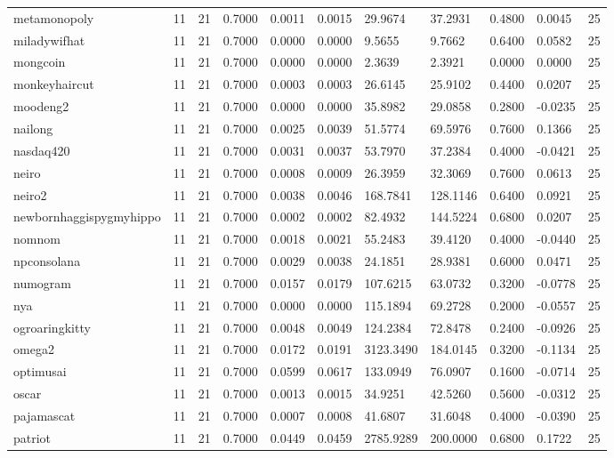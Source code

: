 \begin{table}[htbp]
\begin{tabular}{lllllllllll}
metamonopoly & 11 & 21 & 0.7000 & 0.0011 & 0.0015 & 29.9674 & 37.2931 & 0.4800 & 0.0045 & 25 \\
miladywifhat & 11 & 21 & 0.7000 & 0.0000 & 0.0000 & 9.5655 & 9.7662 & 0.6400 & 0.0582 & 25 \\
mongcoin & 11 & 21 & 0.7000 & 0.0000 & 0.0000 & 2.3639 & 2.3921 & 0.0000 & 0.0000 & 25 \\
monkeyhaircut & 11 & 21 & 0.7000 & 0.0003 & 0.0003 & 26.6145 & 25.9102 & 0.4400 & 0.0207 & 25 \\
moodeng2 & 11 & 21 & 0.7000 & 0.0000 & 0.0000 & 35.8982 & 29.0858 & 0.2800 & -0.0235 & 25 \\
nailong & 11 & 21 & 0.7000 & 0.0025 & 0.0039 & 51.5774 & 69.5976 & 0.7600 & 0.1366 & 25 \\
nasdaq420 & 11 & 21 & 0.7000 & 0.0031 & 0.0037 & 53.7970 & 37.2384 & 0.4000 & -0.0421 & 25 \\
neiro & 11 & 21 & 0.7000 & 0.0008 & 0.0009 & 26.3959 & 32.3069 & 0.7600 & 0.0613 & 25 \\
neiro2 & 11 & 21 & 0.7000 & 0.0038 & 0.0046 & 168.7841 & 128.1146 & 0.6400 & 0.0921 & 25 \\
newbornhaggispygmyhippo & 11 & 21 & 0.7000 & 0.0002 & 0.0002 & 82.4932 & 144.5224 & 0.6800 & 0.0207 & 25 \\
nomnom & 11 & 21 & 0.7000 & 0.0018 & 0.0021 & 55.2483 & 39.4120 & 0.4000 & -0.0440 & 25 \\
npconsolana & 11 & 21 & 0.7000 & 0.0029 & 0.0038 & 24.1851 & 28.9381 & 0.6000 & 0.0471 & 25 \\
numogram & 11 & 21 & 0.7000 & 0.0157 & 0.0179 & 107.6215 & 63.0732 & 0.3200 & -0.0778 & 25 \\
nya & 11 & 21 & 0.7000 & 0.0000 & 0.0000 & 115.1894 & 69.2728 & 0.2000 & -0.0557 & 25 \\
ogroaringkitty & 11 & 21 & 0.7000 & 0.0048 & 0.0049 & 124.2384 & 72.8478 & 0.2400 & -0.0926 & 25 \\
omega2 & 11 & 21 & 0.7000 & 0.0172 & 0.0191 & 3123.3490 & 184.0145 & 0.3200 & -0.1134 & 25 \\
optimusai & 11 & 21 & 0.7000 & 0.0599 & 0.0617 & 133.0949 & 76.0907 & 0.1600 & -0.0714 & 25 \\
oscar & 11 & 21 & 0.7000 & 0.0013 & 0.0015 & 34.9251 & 42.5260 & 0.5600 & -0.0312 & 25 \\
pajamascat & 11 & 21 & 0.7000 & 0.0007 & 0.0008 & 41.6807 & 31.6048 & 0.4000 & -0.0390 & 25 \\
patriot & 11 & 21 & 0.7000 & 0.0449 & 0.0459 & 2785.9289 & 200.0000 & 0.6800 & 0.1722 & 25 \\

\end{tabular}
\end{table}
